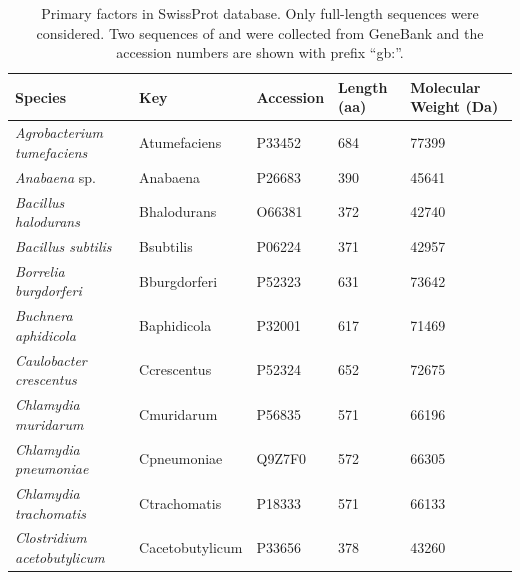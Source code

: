 \begin{table}
\begin{minipage}[c]{\textwidth}
\linespread{1}\normalsize \renewcommand{\arraystretch}{1.3}
\renewcommand{\footnoterule}{}
\caption[Primary \s{} factors in SwissProt database]{Primary \s{}
factors in SwissProt database. Only full-length sequences were
considered. Two sequences of  and  were collected from GeneBank and the accession
numbers are shown with prefix ``gb:''.} \label{rpod_table}
\begin{narrow}{-1in}{-1in}
\centering
\begin{small}
\begin{tabular}{@{}llllp{.7in}@{}}\toprule
\textbf{Species} & \textbf{Key} & \textbf{Accession} &
\textbf{Length (aa)} & \textbf{Molecular Weight (Da)}\\\midrule
{\it Agrobacterium tumefaciens} & Atumefaciens &     P33452 &        684 &      77399 \\

{\it Anabaena} sp.  &   Anabaena &     P26683 &        390 &      45641 \\

{\it Bacillus halodurans} & Bhalodurans &     O66381 &        372 &      42740 \\

{\it Bacillus subtilis} &  Bsubtilis &     P06224 &        371 &      42957 \\

{\it Borrelia burgdorferi } & Bburgdorferi &     P52323 &        631 &      73642 \\

{\it Buchnera aphidicola } & Baphidicola &     P32001 &        617 &      71469 \\

{\it Caulobacter crescentus} & Ccrescentus &     P52324 &        652 &      72675 \\

{\it Chlamydia muridarum} & Cmuridarum &     P56835 &        571 &      66196 \\

{\it Chlamydia pneumoniae } & Cpneumoniae &     Q9Z7F0 &        572 &      66305 \\

{\it Chlamydia trachomatis} & Ctrachomatis &     P18333 &        571 &      66133 \\

{\it Clostridium acetobutylicum} & Cacetobutylicum &     P33656 &        378 &      43260 \\


\end{tabular}
\end{small}
\end{narrow}
\end{minipage}
\end{table}
